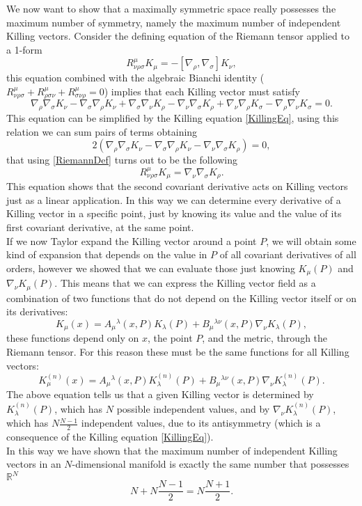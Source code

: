 We now want to show that a maximally symmetric space really possesses the maximum number of symmetry, namely the maximum number of independent Killing vectors.
Consider the defining equation of the Riemann tensor applied to a 1-form
\begin{equation}
    R^{\mu}_{\nu\rho\sigma}K_\mu=-[\nabla_\rho,\nabla_\sigma]K_\nu,\label{RiemannDef}
\end{equation}
this equation combined with the algebraic Bianchi identity ($R^\mu_{\nu\rho\sigma}+R^\mu_{\rho\sigma\nu}+R^\mu_{\sigma\nu\rho}=0 $) implies that each Killing vector must satisfy
$$\nabla_\rho\nabla_\sigma K_\nu-\nabla_\sigma\nabla_\rho K_\nu +\nabla_\sigma\nabla_\nu K_\rho-\nabla_\nu\nabla_\sigma K_\rho+\nabla_\nu\nabla_\rho K_\sigma-\nabla_\rho\nabla_\nu K_\sigma=0.$$
This equation can be simplified by the Killing equation \eqref{KillingEq}, using this relation we can sum pairs of terms obtaining $$ 2(\nabla_\rho\nabla_\sigma K_\nu-\nabla_\sigma\nabla_\rho K_\nu -\nabla_\nu\nabla_\sigma K_\rho)=0,$$ that using \eqref{RiemannDef} turns out to be the following
\begin{equation}
    R^\mu_{\nu\rho\sigma}K_\mu=\nabla_\nu\nabla_\sigma K_\rho. \label{RNabla}
\end{equation}
This equation shows that the second covariant derivative acts on Killing vectors just as a linear application. In this way we can determine every derivative of a Killing vector in a specific point, just by knowing its value and the value of its first covariant derivative, at the same point.\\
If we now Taylor expand the Killing vector around a point $P$, we will obtain some kind of expansion that depends on the value in $P$ of all covariant derivatives of all orders, however we showed that we can evaluate those just knowing $K_\mu(P)$ and $\nabla_\nu K_\mu(P)$. This means that we can express the Killing vector field as a combination of two functions that do not depend on the Killing vector itself or on its derivatives:
\begin{equation*}
    K_\mu(x)=A_\mu\phantom{}^\lambda(x,P)K_\lambda(P)+B_\mu\phantom{}^{\lambda\nu}(x,P)\nabla_\nu K_\lambda(P),
\end{equation*}
these functions depend only on $x$, the point $P$, and the metric, through the Riemann tensor. For this reason these must be the same functions for all Killing vectors:
\begin{equation}\label{KillingExp}
    K_\mu^{(n)}(x)=A_\mu\phantom{}^\lambda(x,P)K_\lambda^{(n)}(P)+B_\mu\phantom{}^{\lambda\nu}(x,P)\nabla_\nu K_\lambda^{(n)}(P).
\end{equation}
The above equation tells us that a given Killing vector is determined by $K_\lambda^{(n)}(P)$, which has $N$ possible independent values, and by $\nabla_\nu K_\lambda^{(n)}(P)$, which has $N\frac{N-1}{2}$ independent values, due to its antisymmetry (which is a consequence of the Killing equation \eqref{KillingEq}).\\
In this way we have shown that the maximum number of independent Killing vectors in an $N$-dimensional manifold is exactly the same number that possesses $\mathbb{R}^N$ $$N+N\frac{N-1}{2}=N\frac{N+1}{2}.$$

